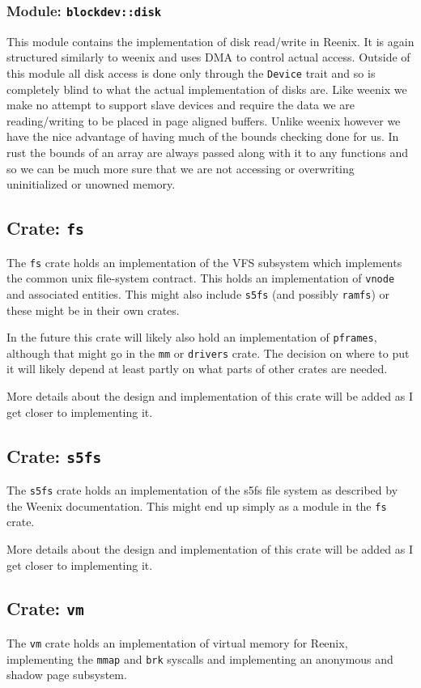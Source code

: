 \documentclass[12pt,letterpaper]{article}
\begin{document}
\subsubsection{Module: \texttt{blockdev::disk}}
This module contains the implementation of disk read/write in Reenix. It is
again structured similarly to weenix and uses DMA to control actual access.
Outside of this module all disk access is done only through the \texttt{Device}
trait and so is completely blind to what the actual implementation of disks
are. Like weenix we make no attempt to support slave devices and require the
data we are reading/writing to be placed in page aligned buffers. Unlike weenix
however we have the nice advantage of having much of the bounds checking done
for us. In rust the bounds of an array are always passed along with it to any
functions and so we can be much more sure that we are not accessing or
overwriting uninitialized or unowned memory.

\subsection{Crate: \texttt{fs}}
The \texttt{fs} crate holds an implementation of the VFS subsystem
which implements the common unix file-system contract. This holds an
implementation of \texttt{vnode} and associated entities. This might
also include \texttt{s5fs} (and possibly \texttt{ramfs}) or these might
be in their own crates.

In the future this crate will likely also hold an implementation
of \texttt{pframes}, although that might go in the \texttt{mm} or
\texttt{drivers} crate. The decision on where to put it will likely
depend at least partly on what parts of other crates are needed.

More details about the design and implementation of this crate will be
added as I get closer to implementing it.

\subsection{Crate: \texttt{s5fs}}
The \texttt{s5fs} crate holds an implementation of the s5fs file system
as described by the Weenix documentation. This might end up simply as a
module in the \texttt{fs} crate.

More details about the design and implementation of this crate will be
added as I get closer to implementing it.

\subsection{Crate: \texttt{vm}}
The \texttt{vm} crate holds an implementation of virtual memory for
Reenix, implementing the \texttt{mmap} and \texttt{brk} syscalls and
implementing an anonymous and shadow page subsystem.
\end{document}
